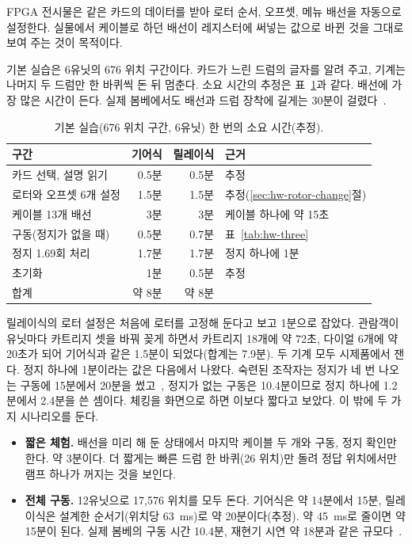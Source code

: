 FPGA 전시물은 같은 카드의 데이터를 받아 로터 순서, 오프셋, 메뉴 배선을 자동으로 설정한다. 실물에서 케이블로
하던 배선이 레지스터에 써넣는 값으로 바뀐 것을 그대로 보여 주는 것이 목적이다.

기본 실습은 6유닛의 676 위치 구간이다. 카드가 느린 드럼의 글자를 알려 주고, 기계는 나머지 두 드럼만 한
바퀴씩 돈 뒤 멈춘다. 소요 시간의 추정은 표~\ref{tab:hw-session}과 같다. 배선에 가장 많은 시간이 든다.
실제 봄베에서도 배선과 드럼 장착에 길게는 30분이 걸렸다~\cite{jackson-bh11}.

\begin{table}[ht]
\centering
\caption{기본 실습(676 위치 구간, 6유닛) 한 번의 소요 시간(추정).}
\label{tab:hw-session}
\small
\begin{tabular}{lrrl}
\toprule
구간 & 기어식 & 릴레이식 & 근거 \\
\midrule
카드 선택, 설명 읽기 & 0.5분 & 0.5분 & 추정 \\
로터와 오프셋 6개 설정 & 1.5분 & 1.5분 & 추정(\ref{sec:hw-rotor-change}절) \\
케이블 13개 배선 & 3분 & 3분 & 케이블 하나에 약 15초 \\
구동(정지가 없을 때) & 0.5분 & 0.7분 & 표~\ref{tab:hw-three} \\
정지 1.69회 처리 & 1.7분 & 1.7분 & 정지 하나에 1분 \\
초기화 & 1분 & 0.5분 & 추정 \\
\midrule
합계 & 약 8분 & 약 8분 & \\
\bottomrule
\end{tabular}
\end{table}

릴레이식의 로터 설정은 처음에 로터를 고정해 둔다고 보고 1분으로 잡았다. 관람객이 유닛마다 카트리지 셋을 바꿔
꽂게 하면서 카트리지 18개에 약 72초, 다이얼 6개에 약 20초가 되어 기어식과 같은 1.5분이 되었다(합계는 7.9분).
두 기계 모두 시제품에서 잰다. 정지 하나에 1분이라는 값은 다음에서 나왔다. 숙련된 조작자는 정지가 네 번 나오는 구동에 15분에서 20분을
썼고~\cite{us6812report1944}, 정지가 없는 구동은 10.4분이므로 정지 하나에 1.2분에서 2.4분을 쓴 셈이다.
체킹을 화면으로 하면 이보다 짧다고 보았다. 이 밖에 두 가지 시나리오를 둔다.

\begin{itemize}
\item \textbf{짧은 체험.} 배선을 미리 해 둔 상태에서 마지막 케이블 두 개와 구동, 정지 확인만 한다. 약 3분이다.
더 짧게는 빠른 드럼 한 바퀴(26 위치)만 돌려 정답 위치에서만 램프 하나가 꺼지는 것을 보인다.
\item \textbf{전체 구동.} 12유닛으로 17,576 위치를 모두 돈다. 기어식은 약 14분에서 15분, 릴레이식은 설계한
순서기(위치당 63~ms)로 약 20분이다(추정). 약 45~ms로 줄이면 약 15분이 된다. 실제 봄베의 구동 시간 10.4분,
재현기 시연 약 18분과 같은 규모다~\cite{jackson-bh09,carter2010bombe}.
\end{itemize}

